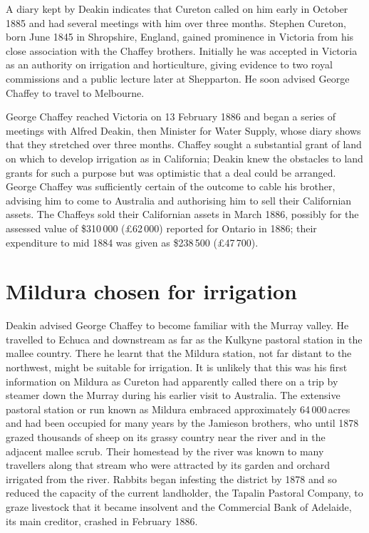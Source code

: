 A diary kept by Deakin indicates that Cureton called on him early in
October 1885 and had several meetings with him over three months.
Stephen Cureton, born June 1845 in Shropshire, England, gained
prominence in Victoria from his close association with the Chaffey
brothers.  Initially he was accepted in Victoria as an authority on
irrigation and horticulture, giving evidence to two royal commissions
and a public lecture later at Shepparton.  He soon advised George
Chaffey to travel to Melbourne.

George Chaffey reached Victoria on 13 February 1886 and began a series
of meetings with Alfred Deakin,  then Minister for
Water Supply, whose diary shows that they stretched over three
months. Chaffey sought a substantial grant of land on which to develop
irrigation as in California; Deakin knew the
obstacles to land grants for such a purpose but was optimistic that a
deal could be arranged.  George Chaffey was sufficiently certain of
the outcome to cable his brother, advising him to come to Australia
and authorising him to sell their Californian assets.  The Chaffeys
sold their Californian assets in March 1886, possibly for the assessed
value of \$310\,000 (\pounds62\,000) reported for Ontario in 1886;
their expenditure to mid 1884 was given as \$238\,500
(\pounds47\,700).

\section*{Mildura chosen for irrigation}

Deakin advised George Chaffey to become familiar with the Murray
valley.  He travelled to Echuca  and downstream as far as the Kulkyne pastoral station in the
mallee country.  There he learnt that the Mildura station, not far
distant to the northwest, might be suitable for irrigation.  It is
unlikely that this was his first information on Mildura as Cureton had
apparently called there on a trip by steamer down the Murray during
his earlier visit to Australia.  The extensive pastoral station or run
known as Mildura embraced approximately 64\,000\,acres and had been
occupied for many years by the Jamieson brothers, 
who until 1878 grazed thousands of sheep on its grassy
country near the river and in the adjacent mallee scrub.  Their
homestead by the river was known to many travellers along that stream
who were attracted by its garden and orchard irrigated from the river.
Rabbits began infesting the district by 1878 and so reduced the
capacity of the current landholder, the Tapalin Pastoral Company, to
graze livestock that it became insolvent and the
Commercial Bank of Adelaide, its main creditor, crashed
in February 1886.

